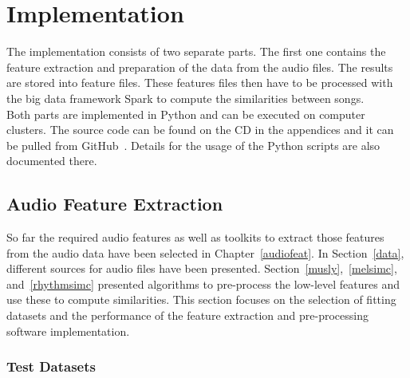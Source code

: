 \chapter{Implementation}\label{implementationdet}

The implementation consists of two separate parts. The first one contains the feature extraction and preparation of the data from the audio files. The results are stored into feature files. These features files then have to be processed with the big data framework Spark to compute the similarities between songs.\\ 
Both parts are implemented in Python and can be executed on computer clusters. The source code can be found on the CD in the appendices and it can be pulled from GitHub~\cite{github-code}. Details for the usage of the Python scripts are also documented there.

\section{Audio Feature Extraction}\label{simmet}

So far the required audio features as well as toolkits to extract those features from the audio data have been selected in Chapter~\ref{audiofeat}.
In Section~\ref{data}, different sources for audio files have been presented. Section~\ref{musly},~\ref{melsimc}, and~\ref{rhythmsimc} presented algorithms to pre-process the low-level features and use these to compute similarities. 
This section focuses on the selection of fitting datasets %
and the performance of the feature extraction and pre-processing software implementation.  

\subsection{Test Datasets}\label{tdset}

